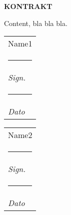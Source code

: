\documentclass[a4paper,12pt,notitlepage]{article}
\makeatletter
\newcommand{\sign}[2][5cm]{%
  \begin{tabular}{@{}p{#1}@{}}
    #2 \\[2\normalbaselineskip] \hrule \\[0pt]
    {\small \textit{Sign.}} \\[2\normalbaselineskip] \hrule \\[0pt]
    {\small \textit{Dato}}
  \end{tabular}
}
\makeatother
\begin{document}
\textbf{KONTRAKT}

Content, bla bla bla.

\vfill

\noindent \sign[6cm]{Name1} \hfill \sign[6cm]{Name2}
\end{document}

